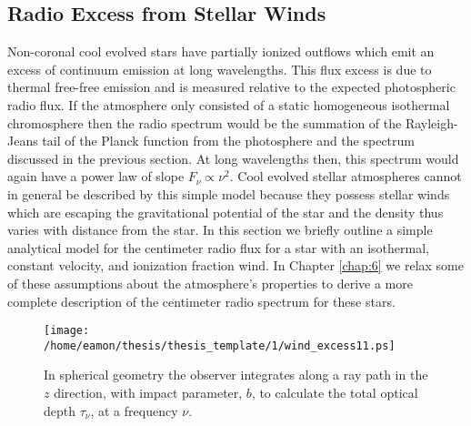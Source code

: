 \subsection{Radio Excess from Stellar Winds}\label{sec:1.8.4}
Non-coronal cool evolved stars have partially ionized outflows which emit an excess of continuum emission at long wavelengths. This flux excess is due to thermal free-free emission and is measured relative to the expected photospheric radio flux. If the atmosphere only consisted of a static homogeneous isothermal chromosphere then the radio spectrum would be the summation of the Rayleigh-Jeans tail of the Planck function from the photosphere and the  spectrum discussed in the previous section. At long wavelengths then, this spectrum would again have a power law of slope $F_{\nu} \propto \nu ^{2}$. Cool evolved stellar atmospheres cannot in general be described by this simple model because they possess stellar winds which are escaping the gravitational potential of the star and the density thus varies with distance from the star. In this section we briefly outline a simple analytical model for the centimeter radio flux for a star with an isothermal, constant velocity, and ionization fraction wind. In Chapter \ref{chap:6} we relax some of these assumptions about the atmosphere's properties to derive a more complete description of the centimeter radio spectrum for these stars.

\begin{figure}[t!]\label{fig:1.5.4}
\centering 
          \texttt{[image: /home/eamon/thesis/thesis\_template/1/wind\_excess11.ps]}
\caption[Schematic for stellar wind radio emission excess]{In spherical geometry the observer integrates along a ray path in the $z$ direction, with impact parameter, $b$, to calculate the total optical depth $\tau _{\nu}$, at a frequency $\nu$.}
\label{fig:1.5.4}
\end{figure}

